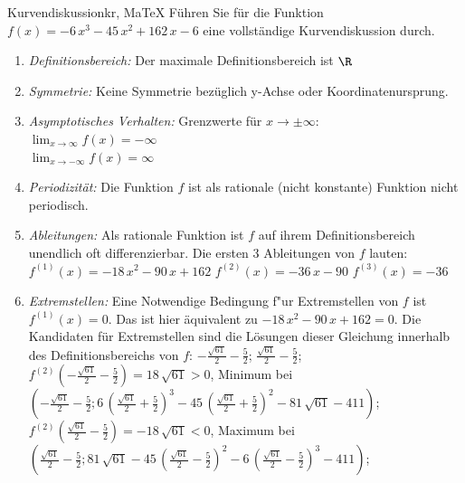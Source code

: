  \providecommand{\MoIl}{(} 
 \providecommand{\MoIr}{)}
 \providecommand{\MIntvlSep}{;} 
 \providecommand{\MElSetSep}{;} 
 \begin{MAufgabe}{Kurvendiskussion}{kr, MaTeX}
 F\"uhren Sie f\"ur die Funktion $f(x)= - 6\, x^3 - 45\, x^2 + 162\, x - 6$ eine vollst\"andige Kurvendiskussion durch.\\ 
 \ifLsg\Loesung
 \begin{enumerate}
 \item \emph{Definitionsbereich:} 
 Der maximale Definitionsbereich ist $\R$\item \emph{Symmetrie:} 
 Keine Symmetrie bez\"uglich y-Achse oder Koordinatenursprung.\item \emph{Asymptotisches Verhalten:} 
 Grenzwerte f\"ur $x\rightarrow \pm \infty$: \\ 
 $\lim_{x\rightarrow \infty} f(x)=- \infty$ \\ 
 $\lim_{x\rightarrow -\infty} f(x)=\infty$ \\ 
 \item \emph{Periodizit\"at:} 
 Die Funktion $f$ ist als rationale (nicht konstante) Funktion nicht periodisch.\item \emph{Ableitungen:} 
 Als rationale Funktion ist $f$ auf ihrem Definitionsbereich unendlich oft differenzierbar. 
 Die ersten 3 Ableitungen von $f$ lauten: \\ 
 $f^{(1)}(x)= - 18\, x^2 - 90\, x + 162$\newline 
  $f^{(2)}(x)= - 36\, x - 90$\newline 
  $f^{(3)}(x)=-36$\newline 
  \item \emph{Extremstellen:} 
 Eine Notwendige Bedingung f"ur Extremstellen von $f$ ist $f^{(1)}(x)=0$. 
 Das ist hier \"aquivalent zu $ - 18\, x^2 - 90\, x + 162=0$. 
 Die Kandidaten f\"ur Extremstellen sind die L\"osungen dieser Gleichung innerhalb des Definitionsbereichs von $f$: $ - \frac{\sqrt{61}}{2} - \frac{5}{2}$; $\frac{\sqrt{61}}{2} - \frac{5}{2}$; \\ 
 $f^{(2)}( - \frac{\sqrt{61}}{2} - \frac{5}{2})=18\, \sqrt{61}$$>0$, Minimum bei $( - \frac{\sqrt{61}}{2} - \frac{5}{2};6\, {\left(\frac{\sqrt{61}}{2} + \frac{5}{2}\right)}^3 - 45\, {\left(\frac{\sqrt{61}}{2} + \frac{5}{2}\right)}^2 - 81\, \sqrt{61} - 411)$; \\ 
 $f^{(2)}(\frac{\sqrt{61}}{2} - \frac{5}{2})=- 18\, \sqrt{61}$$<0$, Maximum bei $(\frac{\sqrt{61}}{2} - \frac{5}{2};81\, \sqrt{61} - 45\, {\left(\frac{\sqrt{61}}{2} - \frac{5}{2}\right)}^2 - 6\, {\left(\frac{\sqrt{61}}{2} - \frac{5}{2}\right)}^3 - 411)$; \\ 

\end{enumerate}
\end{MAufgabe}
